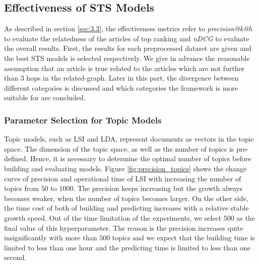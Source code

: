 \subsection{Effectiveness of STS Models}
\label{sec:5.2}

As described in section \ref{sec:3.3}, the effectiveness metrics refer to \textit{precision@k@h} to evaluate the relatedness of the articles of top ranking and \textit{nDCG} to evaluate the overall results. First, the results for each preprocessed dataset are given and the best STS models is selected respectively. We give in advance the reasonable assumption that an article is true related to the articles which are not further than $3$ hops in the related-graph. Later in this part, the divergence between different categories is discussed and which categories the framework is more suitable for are concluded.  

\subsubsection{Parameter Selection for Topic Models}

Topic models, such as LSI and LDA, represent documents as vectors in the topic space. The dimension of the topic space, as well as the number of topics is pre-defined. Hence, it is necessary to determine the optimal number of topics before building and evaluating models. Figure \ref{fig:precision_topics} shows the change curve of precision and operational time of LSI with increasing the number of topics from $50$ to $1000$. The precision keeps increasing but the growth always becomes weaker, when the number of topics becomes larger. On the other side, the time cost of both of building and predicting increases with a relative stable growth speed. Out of the time limitation of the experiments, we select $500$ as the final value of this hyperparameter. The reason is the precision increases quite insignificantly with more than $500$ topics and we expect that the building time is limited to less than one hour and the predicting time is limited to less than one second. 

